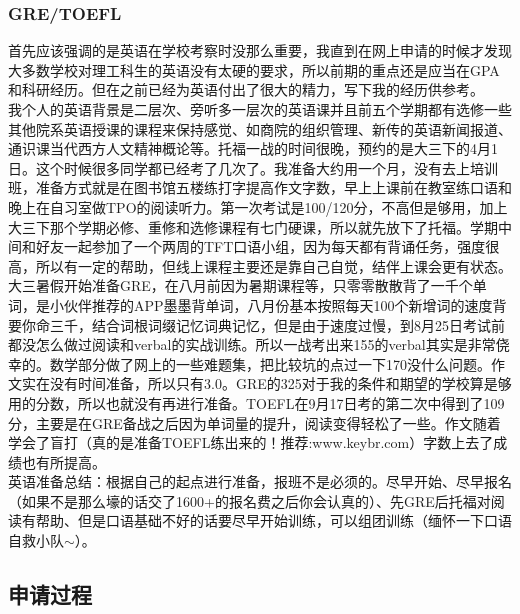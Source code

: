 \documentclass[a4paper,UTF8]{book}
\begin{document}
        \subsubsection*{GRE/TOEFL}
        首先应该强调的是英语在学校考察时没那么重要，我直到在网上申请的时候才发现大多数学校对理工科生的英语没有太硬的要求，所以前期的重点还是应当在GPA和科研经历。但在之前已经为英语付出了很大的精力，写下我的经历供参考。\\
        我个人的英语背景是二层次、旁听多一层次的英语课并且前五个学期都有选修一些其他院系英语授课的课程来保持感觉、如商院的组织管理、新传的英语新闻报道、通识课当代西方人文精神概论等。托福一战的时间很晚，预约的是大三下的4月1日。这个时候很多同学都已经考了几次了。我准备大约用一个月，没有去上培训班，准备方式就是在图书馆五楼练打字提高作文字数，早上上课前在教室练口语和晚上在自习室做TPO的阅读听力。第一次考试是100/120分，不高但是够用，加上大三下那个学期必修、重修和选修课程有七门硬课，所以就先放下了托福。学期中间和好友一起参加了一个两周的TFT口语小组，因为每天都有背诵任务，强度很高，所以有一定的帮助，但线上课程主要还是靠自己自觉，结伴上课会更有状态。\\
        大三暑假开始准备GRE，在八月前因为暑期课程等，只零零散散背了一千个单词，是小伙伴推荐的APP墨墨背单词，八月份基本按照每天100个新增词的速度背要你命三千，结合词根词缀记忆词典记忆，但是由于速度过慢，到8月25日考试前都没怎么做过阅读和verbal的实战训练。所以一战考出来155的verbal其实是非常侥幸的。数学部分做了网上的一些难题集，把比较坑的点过一下170没什么问题。作文实在没有时间准备，所以只有3.0。GRE的325对于我的条件和期望的学校算是够用的分数，所以也就没有再进行准备。TOEFL在9月17日考的第二次中得到了109分，主要是在GRE备战之后因为单词量的提升，阅读变得轻松了一些。作文随着学会了盲打（真的是准备TOEFL练出来的！推荐:www.keybr.com）字数上去了成绩也有所提高。\\
        英语准备总结：根据自己的起点进行准备，报班不是必须的。尽早开始、尽早报名（如果不是那么壕的话交了1600+的报名费之后你会认真的）、先GRE后托福对阅读有帮助、但是口语基础不好的话要尽早开始训练，可以组团训练（缅怀一下口语自救小队$\sim$）。

    \subsection*{申请过程}
\end{document}
